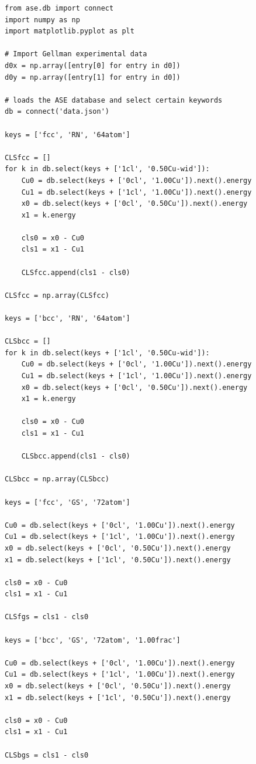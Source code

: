 \documentclass[number, sort&compress, review, 12pt]{elsarticle}
\begin{document}
\begin{verbatim}
from ase.db import connect
import numpy as np
import matplotlib.pyplot as plt

# Import Gellman experimental data
d0x = np.array([entry[0] for entry in d0])
d0y = np.array([entry[1] for entry in d0])

# loads the ASE database and select certain keywords
db = connect('data.json')

keys = ['fcc', 'RN', '64atom']

CLSfcc = []
for k in db.select(keys + ['1cl', '0.50Cu-wid']):
    Cu0 = db.select(keys + ['0cl', '1.00Cu']).next().energy
    Cu1 = db.select(keys + ['1cl', '1.00Cu']).next().energy
    x0 = db.select(keys + ['0cl', '0.50Cu']).next().energy
    x1 = k.energy

    cls0 = x0 - Cu0
    cls1 = x1 - Cu1

    CLSfcc.append(cls1 - cls0)

CLSfcc = np.array(CLSfcc)

keys = ['bcc', 'RN', '64atom']

CLSbcc = []
for k in db.select(keys + ['1cl', '0.50Cu-wid']):
    Cu0 = db.select(keys + ['0cl', '1.00Cu']).next().energy
    Cu1 = db.select(keys + ['1cl', '1.00Cu']).next().energy
    x0 = db.select(keys + ['0cl', '0.50Cu']).next().energy
    x1 = k.energy

    cls0 = x0 - Cu0
    cls1 = x1 - Cu1

    CLSbcc.append(cls1 - cls0)

CLSbcc = np.array(CLSbcc)

keys = ['fcc', 'GS', '72atom']

Cu0 = db.select(keys + ['0cl', '1.00Cu']).next().energy
Cu1 = db.select(keys + ['1cl', '1.00Cu']).next().energy
x0 = db.select(keys + ['0cl', '0.50Cu']).next().energy
x1 = db.select(keys + ['1cl', '0.50Cu']).next().energy

cls0 = x0 - Cu0
cls1 = x1 - Cu1

CLSfgs = cls1 - cls0

keys = ['bcc', 'GS', '72atom', '1.00frac']

Cu0 = db.select(keys + ['0cl', '1.00Cu']).next().energy
Cu1 = db.select(keys + ['1cl', '1.00Cu']).next().energy
x0 = db.select(keys + ['0cl', '0.50Cu']).next().energy
x1 = db.select(keys + ['1cl', '0.50Cu']).next().energy

cls0 = x0 - Cu0
cls1 = x1 - Cu1

CLSbgs = cls1 - cls0


\end{verbatim}
\end{document}
